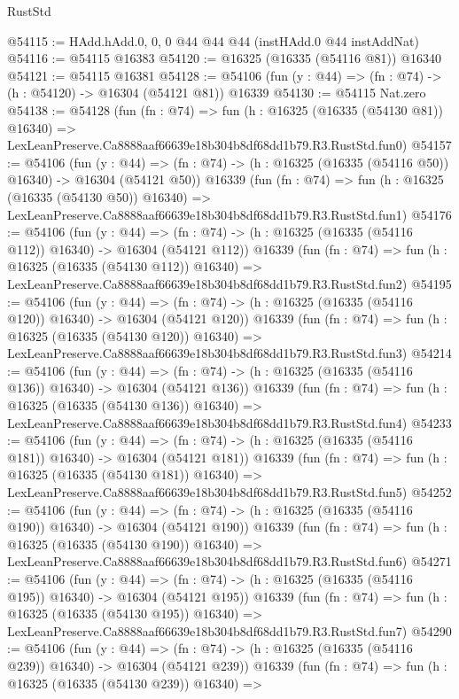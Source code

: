 \begin{lexlean}{RustStd}
\begin{coremodule}
@54115 := HAdd.hAdd.{0, 0, 0} @44 @44 @44 (instHAdd.{0} @44 instAddNat)
@54116 := @54115 @16383
@54120 := @16325 (@16335 (@54116 @81)) @16340
@54121 := @54115 @16381
@54128 := @54106 (fun (y : @44) => (fn : @74) -> (h : @54120) -> @16304 (@54121 @81)) @16339
@54130 := @54115 Nat.zero
@54138 := @54128
    (fun (fn : @74) =>
    fun (h : @16325 (@16335 (@54130 @81)) @16340) =>
    LexLeanPreserve.Ca8888aaf66639e18b304b8df68dd1b79.R3.RustStd.fun0)
@54157 := @54106
    (fun (y : @44) =>
    (fn : @74) -> (h : @16325 (@16335 (@54116 @50)) @16340) -> @16304 (@54121 @50))
    @16339
    (fun (fn : @74) =>
    fun (h : @16325 (@16335 (@54130 @50)) @16340) =>
    LexLeanPreserve.Ca8888aaf66639e18b304b8df68dd1b79.R3.RustStd.fun1)
@54176 := @54106
    (fun (y : @44) =>
    (fn : @74) -> (h : @16325 (@16335 (@54116 @112)) @16340) -> @16304 (@54121 @112))
    @16339
    (fun (fn : @74) =>
    fun (h : @16325 (@16335 (@54130 @112)) @16340) =>
    LexLeanPreserve.Ca8888aaf66639e18b304b8df68dd1b79.R3.RustStd.fun2)
@54195 := @54106
    (fun (y : @44) =>
    (fn : @74) -> (h : @16325 (@16335 (@54116 @120)) @16340) -> @16304 (@54121 @120))
    @16339
    (fun (fn : @74) =>
    fun (h : @16325 (@16335 (@54130 @120)) @16340) =>
    LexLeanPreserve.Ca8888aaf66639e18b304b8df68dd1b79.R3.RustStd.fun3)
@54214 := @54106
    (fun (y : @44) =>
    (fn : @74) -> (h : @16325 (@16335 (@54116 @136)) @16340) -> @16304 (@54121 @136))
    @16339
    (fun (fn : @74) =>
    fun (h : @16325 (@16335 (@54130 @136)) @16340) =>
    LexLeanPreserve.Ca8888aaf66639e18b304b8df68dd1b79.R3.RustStd.fun4)
@54233 := @54106
    (fun (y : @44) =>
    (fn : @74) -> (h : @16325 (@16335 (@54116 @181)) @16340) -> @16304 (@54121 @181))
    @16339
    (fun (fn : @74) =>
    fun (h : @16325 (@16335 (@54130 @181)) @16340) =>
    LexLeanPreserve.Ca8888aaf66639e18b304b8df68dd1b79.R3.RustStd.fun5)
@54252 := @54106
    (fun (y : @44) =>
    (fn : @74) -> (h : @16325 (@16335 (@54116 @190)) @16340) -> @16304 (@54121 @190))
    @16339
    (fun (fn : @74) =>
    fun (h : @16325 (@16335 (@54130 @190)) @16340) =>
    LexLeanPreserve.Ca8888aaf66639e18b304b8df68dd1b79.R3.RustStd.fun6)
@54271 := @54106
    (fun (y : @44) =>
    (fn : @74) -> (h : @16325 (@16335 (@54116 @195)) @16340) -> @16304 (@54121 @195))
    @16339
    (fun (fn : @74) =>
    fun (h : @16325 (@16335 (@54130 @195)) @16340) =>
    LexLeanPreserve.Ca8888aaf66639e18b304b8df68dd1b79.R3.RustStd.fun7)
@54290 := @54106
    (fun (y : @44) =>
    (fn : @74) -> (h : @16325 (@16335 (@54116 @239)) @16340) -> @16304 (@54121 @239))
    @16339
    (fun (fn : @74) =>
    fun (h : @16325 (@16335 (@54130 @239)) @16340) =>

\end{coremodule}
\end{lexlean}
